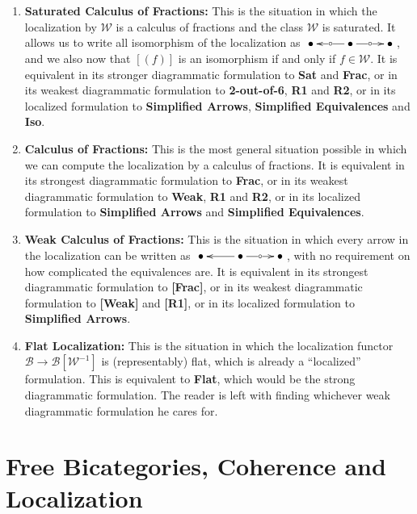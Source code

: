 \documentclass{article}
\numberwithin{equation}{section}
\theoremstyle{definition}
\theoremstyle{plain}
\begin{document}
\begin{enumerate}[label = $\bullet$]
	\item \textbf{Saturated Calculus of Fractions:} This is the situation in which the localization by $\mathcal{W}$ is a calculus of fractions and the class $\mathcal{W}$ is saturated. It allows us to write all isomorphism of the localization as $\xymatrix{\bullet & \bullet \ar[r]|{\circ} \ar[l]|{\circ} & \bullet}$, and we also now that $[(f)]$ is an isomorphism if and only if $f \in \mathcal{W}$. It is equivalent in its stronger diagrammatic formulation to  \textbf{Sat} and \textbf{Frac}, or in its weakest diagrammatic formulation to \textbf{2-out-of-6}, \textbf{R1} and \textbf{R2}, or in its localized formulation to \textbf{Simplified Arrows}, \textbf{Simplified Equivalences} and \textbf{Iso}.
	\item \textbf{Calculus of Fractions:} This is the most general situation possible in which we can compute the localization by a calculus of fractions. It is equivalent in its strongest diagrammatic formulation to \textbf{Frac}, or in its weakest diagrammatic formulation to \textbf{Weak}, \textbf{R1} and \textbf{R2}, or in its localized formulation to \textbf{Simplified Arrows} and \textbf{Simplified Equivalences}.
	\item \textbf{Weak Calculus of Fractions:} This is the situation in which every arrow in the localization can be written as $\xymatrix{\bullet & \bullet \ar[r]|{\circ} \ar[l] & \bullet}$, with no requirement on how complicated the equivalences are. It is equivalent in its strongest diagrammatic formulation to \textbf{[Frac]}, or in its weakest diagrammatic formulation to \textbf{[Weak]} and \textbf{[R1]}, or in its localized formulation to \textbf{Simplified Arrows}.
	\item \textbf{Flat Localization:} This is the situation in which the localization functor $\mathcal{B} \to \mathcal{B}[\mathcal{W}^{-1}]$ is (representably) flat, which is already a ``localized'' formulation. This is equivalent to \textbf{Flat}, which would be the strong diagrammatic formulation. The reader is left with finding whichever weak diagrammatic formulation he cares for.
\end{enumerate}

\newpage

\section{Free Bicategories, Coherence and Localization}
\end{document}
